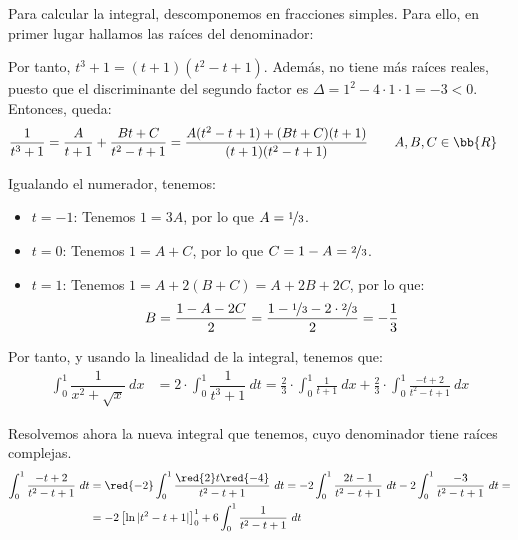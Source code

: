 \begin{ejercicio}
\begin{enumerate}
        Para calcular la integral, descomponemos en fracciones simples. Para ello, en primer lugar hallamos las raíces del denominador:
        \begin{figure}[H]
            \centering
        \end{figure}

        Por tanto, $t^3+1=(t+1)(t^2-t+1)$. Además, no tiene más raíces reales,
        puesto que el discriminante del segundo factor es
        $\Delta = 1^2-4\cdot 1\cdot 1 = -3 < 0$. Entonces, queda:
        \begin{align*}
            \dfrac{1}{t^3 + 1}
            &= \dfrac{A}{t+1} + \dfrac{Bt+C}{t^2-t+1}
            = \dfrac{A(t^2-t+1) + (Bt+C)(t+1)}{(t+1)(t^2-t+1)}
            \qquad A,B,C\in \bb{R}
        \end{align*}

        Igualando el numerador, tenemos:
        \begin{itemize}
            \item \ul{$t=-1$}: Tenemos $1=3A$, por lo que $A=\nicefrac{1}{3}$.
            \item \ul{$t=0$}: Tenemos $1=A+C$, por lo que $C=1-A=\nicefrac{2}{3}$.
            \item \ul{$t=1$}: Tenemos $1=A+2(B+C)=A+2B+2C$, por lo que:
            \begin{equation*}
                B = \frac{1-A-2C}{2} = \frac{1-\nicefrac{1}{3}-2\cdot \nicefrac{2}{3}}{2} = -\frac{1}{3}
            \end{equation*}
        \end{itemize}

        Por tanto, y usando la linealidad de la integral, tenemos que:
        \begin{align*}
            \int_0^1 \dfrac{1}{x^2 + \sqrt{x}}~dx
            &= 2\cdot \int_0^1 \dfrac{1}{t^3 + 1}~dt
            = \frac{2}{3}\cdot \int_0^1 \frac{1}{t+1}~dx
            + \frac{2}{3}\cdot \int_0^1 \frac{-t+2}{t^2-t+1}~dx
        \end{align*}

        Resolvemos ahora la nueva integral que tenemos, cuyo denominador tiene raíces complejas.
        \begin{align*}
            \int_0^1 \dfrac{-t+2}{t^2-t+1}~dt
            &= \red{-2} \int_0^1 \dfrac{\red{2}t \red{-4}}{t^2-t+1}~dt
            = -2\int_0^1 \dfrac{2t-1}{t^2-t+1}~dt
            -2\int_0^1 \dfrac{-3}{t^2-t+1}~dt
            =\\&= -2\left[\ln|t^2-t+1|\right]_0^1
            + 6\int_0^1 \dfrac{1}{t^2-t+1}~dt
        \end{align*}


\end{enumerate}
\end{ejercicio}
